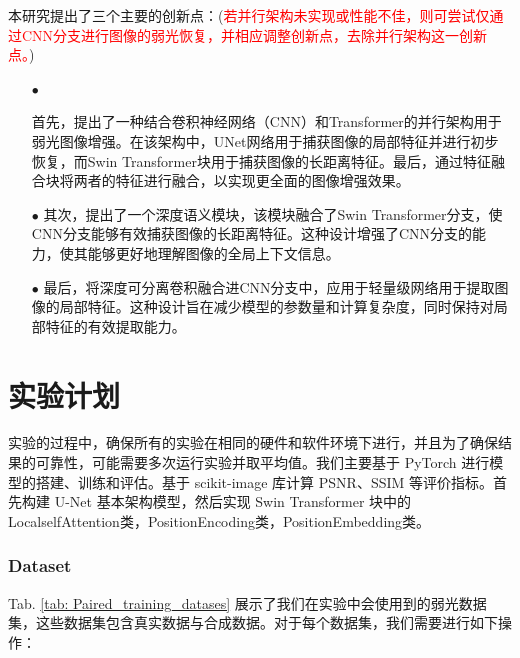\documentclass[a4paper, 10pt]{article}
\begin{document}
		本研究提出了三个主要的创新点：(\textcolor{red}{若并行架构未实现或性能不佳，则可尝试仅通过CNN分支进行图像的弱光恢复，并相应调整创新点，去除并行架构这一创新点。})
		\begin{itemize}
			\item[$\bullet$]
			
			首先，提出了一种结合卷积神经网络（CNN）和Transformer的并行架构用于弱光图像增强。在该架构中，UNet网络用于捕获图像的局部特征并进行初步恢复，而Swin Transformer块用于捕获图像的长距离特征。最后，通过特征融合块将两者的特征进行融合，以实现更全面的图像增强效果。
			\item[$\bullet$] 
			其次，提出了一个深度语义模块，该模块融合了Swin Transformer分支，使CNN分支能够有效捕获图像的长距离特征。这种设计增强了CNN分支的能力，使其能够更好地理解图像的全局上下文信息。
			\item[$\bullet$]
			最后，将深度可分离卷积融合进CNN分支中，应用于轻量级网络用于提取图像的局部特征。这种设计旨在减少模型的参数量和计算复杂度，同时保持对局部特征的有效提取能力。
		\end{itemize}
		
		\section{实验计划}

		实验的过程中，确保所有的实验在相同的硬件和软件环境下进行，并且为了确保结果的可靠性，可能需要多次运行实验并取平均值。我们主要基于 PyTorch 进行模型的搭建、训练和评估。基于 scikit-image 库计算 PSNR、SSIM 等评价指标。首先构建 U-Net 基本架构模型，然后实现 Swin Transformer 块中的LocalselfAttention类，PositionEncoding类，PositionEmbedding类。

		\subsubsection{Dataset}
		
		Tab. \ref{tab: Paired_training_datases} 展示了我们在实验中会使用到的弱光数据集，这些数据集包含真实数据与合成数据。对于每个数据集，我们需要进行如下操作：
		
\end{document}
